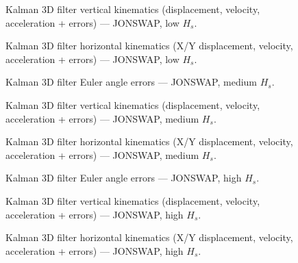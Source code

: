 \documentclass[11pt,letterpaper]{article}
\begin{document}
\begin{figure}[H]\centering
  \resizebox{\textwidth}{!}{}
  \caption{Kalman 3D filter vertical kinematics (displacement, velocity, acceleration + errors) — JONSWAP, low $H_s$.}
  \label{fig:w3d_jonswap_low_zkin}
\end{figure}

\begin{figure}[H]\centering
  \resizebox{\textwidth}{!}{}
  \caption{Kalman 3D filter horizontal kinematics (X/Y displacement, velocity, acceleration + errors) — JONSWAP, low $H_s$.}
  \label{fig:w3d_jonswap_low_xykin}
\end{figure}

\begin{figure}[H]\centering
  \resizebox{\textwidth}{!}{}
  \caption{Kalman 3D filter Euler angle errors — JONSWAP, medium $H_s$.}
  \label{fig:w3d_jonswap_medium_angle_errs}
\end{figure}

\begin{figure}[H]\centering
  \resizebox{\textwidth}{!}{}
  \caption{Kalman 3D filter vertical kinematics (displacement, velocity, acceleration + errors) — JONSWAP, medium $H_s$.}
  \label{fig:w3d_jonswap_medium_zkin}
\end{figure}

\begin{figure}[H]\centering
  \resizebox{\textwidth}{!}{}
  \caption{Kalman 3D filter horizontal kinematics (X/Y displacement, velocity, acceleration + errors) — JONSWAP, medium $H_s$.}
  \label{fig:w3d_jonswap_medium_xykin}
\end{figure}

\begin{figure}[H]\centering
  \resizebox{\textwidth}{!}{}
  \caption{Kalman 3D filter Euler angle errors — JONSWAP, high $H_s$.}
  \label{fig:w3d_jonswap_high_angle_errs}
\end{figure}

\begin{figure}[H]\centering
  \resizebox{\textwidth}{!}{}
  \caption{Kalman 3D filter vertical kinematics (displacement, velocity, acceleration + errors) — JONSWAP, high $H_s$.}
  \label{fig:w3d_jonswap_high_zkin}
\end{figure}

\begin{figure}[H]\centering
  \resizebox{\textwidth}{!}{}
  \caption{Kalman 3D filter horizontal kinematics (X/Y displacement, velocity, acceleration + errors) — JONSWAP, high $H_s$.}
  \label{fig:w3d_jonswap_high_xykin}
\end{figure}
\end{document}
